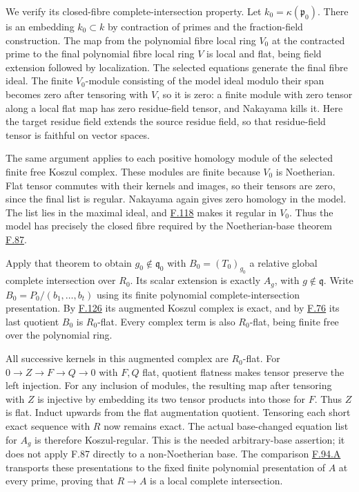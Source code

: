 \documentclass[11pt,a4paper,openany]{report}
\begin{document}
We verify its closed-fibre complete-intersection property. Let \(k_0=\kappa(\mathfrak p_0)\). There is an embedding \(k_0\subset k\) by contraction of primes and the fraction-field construction. The map from the polynomial fibre local ring \(V_0\) at the contracted prime to the final polynomial fibre local ring \(V\) is local and flat, being field extension followed by localization. The selected equations generate the final fibre ideal. The finite \(V_0\)-module consisting of the model ideal modulo their span becomes zero after tensoring with \(V\), so it is zero: a finite module with zero tensor along a local flat map has zero residue-field tensor, and Nakayama kills it. Here the target residue field extends the source residue field, so that residue-field tensor is faithful on vector spaces.

The same argument applies to each positive homology module of the selected finite free Koszul complex. These modules are finite because \(V_0\) is Noetherian. Flat tensor commutes with their kernels and images, so their tensors are zero, since the final list is regular. Nakayama again gives zero homology in the model. The list lies in the maximal ideal, and \hyperref[AG-RG-S05-more-algebra-lemma-noetherian-finite-all-equivalent]{F.118} makes it regular in \(V_0\). Thus the model has precisely the closed fibre required by the Noetherian-base theorem \hyperref[AG-RG-S05-algebra-lemma-syntomic]{F.87}.

Apply that theorem to obtain \(g_0\notin\mathfrak q_0\) with \(B_0=(T_0)_{g_0}\) a relative global complete intersection over \(R_0\). Its scalar extension is exactly \(A_g\), with \(g\notin\mathfrak q\). Write \(B_0=P_0/(b_1,\ldots,b_t)\) using its finite polynomial complete-intersection presentation. By \hyperref[AG-RG-S05-more-algebra-lemma-relative-global-complete-intersection-koszul]{F.126} its augmented Koszul complex is exact, and by \hyperref[AG-RG-S05-algebra-lemma-relative-global-complete-intersection]{F.76} its last quotient \(B_0\) is \(R_0\)-flat. Every complex term is also \(R_0\)-flat, being finite free over the polynomial ring.

All successive kernels in this augmented complex are \(R_0\)-flat. For \(0\to Z\to F\to Q\to0\) with \(F,Q\) flat, quotient flatness makes tensor preserve the left injection. For any inclusion of modules, the resulting map after tensoring with \(Z\) is injective by embedding its two tensor products into those for \(F\). Thus \(Z\) is flat. Induct upwards from the flat augmentation quotient. Tensoring each short exact sequence with \(R\) now remains exact. The actual base-changed equation list for \(A_g\) is therefore Koszul-regular. This is the needed arbitrary-base assertion; it does not apply F.87 directly to a non-Noetherian base. The comparison \hyperref[AG-RG-S05-more-algebra-lemma-lci-presentation-independent]{F.94.A} transports these presentations to the fixed finite polynomial presentation of \(A\) at every prime, proving that \(R\to A\) is a local complete intersection.
\end{document}

